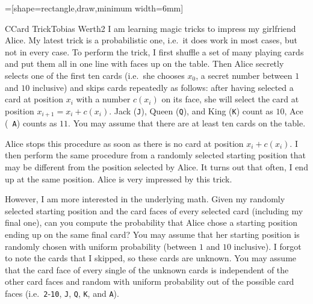 =[shape=rectangle,draw,minimum width=6mm]

\begin{icpcproblem}{C}{Card Trick}{Tobias Werth}{2}
I am learning magic tricks to impress my girlfriend Alice. My latest trick is
a probabilistic one, i.e.\ it does work in most cases, but not in every case.
To perform the trick, I first shuffle a set of many playing cards and put them all in
one line with faces up on the table. Then Alice secretly selects one of the
first ten cards (i.e.\ she chooses $x_0$, a secret number between $1$ and $10$
inclusive) and skips cards repeatedly as follows: after having selected a card
at position $x_i$ with a number $c(x_i)$ on its face, she will select the card
at position $x_{i+1} = x_i+c(x_i)$.
Jack ({\tt J}), Queen ({\tt Q}), and King ({\tt K}) count as $10$, Ace ({\tt
A}) counts as $11$. You may assume that there are at least ten cards on the
table.

Alice stops this procedure as soon as there is no card at position
$x_i+c(x_i)$. I then perform the same procedure from a randomly selected
starting position that may be different from the position selected by
Alice.  It turns out that often, I end up at the same position. Alice is
very impressed by this trick.

However, I am more interested in the underlying math. Given my randomly
selected starting position and the card faces of every selected card (including my final one), can
you compute the probability that Alice chose a starting position ending up on the same
final card? You may assume that her starting position is randomly chosen with
uniform probability (between $1$ and $10$ inclusive).
I forgot to note the cards that I skipped, so these cards are unknown.
You may assume that the card face of every single of the unknown cards is independent of the other
card faces and random with uniform probability out of the possible card faces
(i.e.\ {\tt2}-{\tt10}, {\tt J}, {\tt Q}, {\tt K}, and {\tt A}).


\end{icpcproblem}
